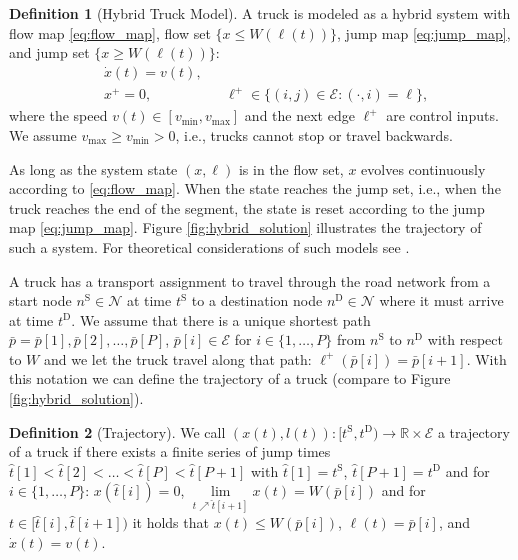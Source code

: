 \documentclass[letterpaper,10pt,conference,twocolumn]{IEEEtran}
\newcommand{\set}[1]{\mathcal{#1}}
\newcommand{\op}[1]{\mathrm{#1}}
\theoremstyle{definition}
\newtheorem{defi}{Definition}
\begin{document}
\begin{defi}[Hybrid Truck Model]\label{def:hybrid_truck_model}
A truck is modeled as a hybrid system with flow map \eqref{eq:flow_map}, flow set $\{x \leq W(\ell(t))\}$, jump map \eqref{eq:jump_map}, and jump set $\{x \geq W(\ell(t))\}$:
\begin{align}
 &\dot{x}(t) = v(t), && \label{eq:flow_map}\\
 &x^+ = 0, &&\ell^+ \in \{(i,j) \in \set{E}: (\cdot,i) = \ell\}, \label{eq:jump_map}
\end{align}
where the speed $v(t) \in [v_{\min},v_{\max}]$ and the next edge $\ell^+$ are control inputs. We assume $v_{\max} \geq v_{\min} > 0$, i.e., trucks cannot stop or travel backwards.
\end{defi}
As long as the system state $(x,\ell)$ is in the flow set, $x$ evolves continuously according to \eqref{eq:flow_map}. When the state reaches the jump set, i.e., when the truck reaches the end of the segment, the state is reset according to the jump map \eqref{eq:jump_map}. Figure \ref{fig:hybrid_solution} illustrates the trajectory of such a system. For theoretical considerations of such models see \cite{hybridbook}.

A truck has a transport assignment to travel through the road network from a start node $n^\op{S} \in \set{N}$ at time $t^\op{S}$ to a destination node $n^\op{D} \in \set{N}$ where it must arrive at time $t^\op{D}$. We assume that there is a unique shortest path $\bar{p} = \bar{p}[1],\bar{p}[2],\dots,\bar{p}[P]$, $\bar{p}[i] \in \set{E}$ for $i \in \{1,\dots,P\}$ from $n^\op{S}$ to $n^\op{D}$ with respect to $W$ and we let the truck travel along that path: $\ell^+(\bar{p}[i]) = \bar{p}[i+1]$. With this notation we can define the trajectory of a truck (compare to Figure \ref{fig:hybrid_solution}). 
\begin{defi}[Trajectory]\label{def:trajectory}
 We call $(x(t),l(t)): [t^\op{S},t^\op{D}) \rightarrow \mathbb{R} \times \set{E}$ a trajectory of a truck if there exists a finite series of jump times $\hat{t}[1] < \hat{t}[2] < \dots < \hat{t}[P] < \hat{t}[P+1]$ with $\hat{t}[1] = t^\op{S}$, $\hat{t}[P+1] = t^\op{D}$ and for $i \in \{1,\dots,P\}$: $x(\hat{t}[i]) = 0$, $\lim\limits_{t \nearrow \hat{t}[i+1]}x(t) = W(\bar{p}[i])$ and for $t \in [\hat{t}[i],\hat{t}[i+1])$ it holds that $x(t) \leq W(\bar{p}[i])$, $\ell(t) = \bar{p}[i]$, and $\dot{x}(t) = v(t)$. 
\end{defi}
\end{document}
